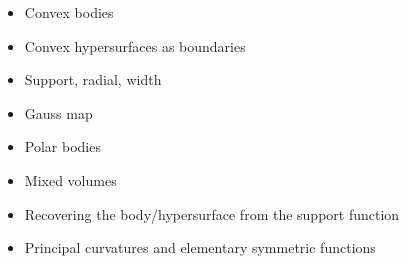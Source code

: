\begin{itemize}
\item Convex bodies
\item Convex hypersurfaces as boundaries
\item Support, radial, width
\item Gauss map
\item Polar bodies
\item Mixed volumes
\item Recovering the body/hypersurface from the support function
\item Principal curvatures and elementary symmetric functions
\end{itemize}
